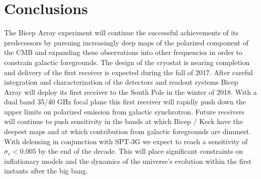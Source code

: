 \documentclass[12pt]{article}
\begin{document}
\section{Conclusions}
The Bicep Array experiment will continue the successful achievements of its
predecessors by pursuing increasingly deep maps of the polarized component of
the CMB and expanding these observations into other frequencies in order to
constrain galactic foregrounds. The design of the cryostat is nearing
completion and delivery of the first receiver is expected during the fall of
2017. After careful integration and characterization of the detectors and
readout systems Bicep Array will deploy its first receiver to the South Pole
in the winter of 2018. With a dual band 35/40 GHz focal plane this first
receiver will rapidly push down the upper limits on polarized emission from
galactic synchrotron. Future receivers will continue to push sensitivity in
the bands at which Bicep / Keck have the deepest maps and at which
contribution from galactic foregrounds are dimmest. With delensing in
conjunction with SPT-3G we expect to reach a sensitivity of $\sigma _r <
0.005$ by the end of the decade. This will place significant constraints on
inflationary models and the dynamics of the universe's evolution within the
first instants after the big bang.










\printbibliography
\end{document}
